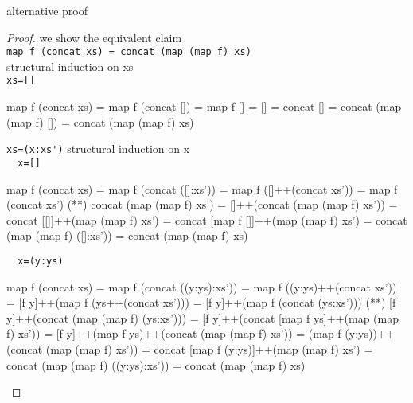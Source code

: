 \newpage
alternative proof
\begin{proof} we show the equivalent claim \\
\verb|map f (concat xs) = concat (map (map f) xs)|\\
structural induction on xs\\
\verb|xs=[]|
\begin{code}
map f (concat xs) = map f (concat [])
                  = map f []
                  = []
                  = concat []
                  = concat (map (map f) [])
                  = concat (map (map f) xs)
\end{code}
\verb|xs=(x:xs')|
structural induction on x\\
\verb|  x=[]|
\begin{code}
map f (concat xs) = map f (concat ([]:xs'))
                  = map f ([]++(concat xs'))
                  = map f (concat xs')
                  (**) concat (map (map f) xs')
                  = []++(concat (map (map f) xs'))
                  = concat [[]]++(map (map f) xs')
                  = concat [map f []]++(map (map f) xs')
                  = concat (map (map f) ([]:xs'))
                  = concat (map (map f) xs)
\end{code}
\verb|  x=(y:ys)|
\begin{code}
map f (concat xs) = map f (concat ((y:ys):xs'))
                  = map f ((y:ys)++(concat xs'))
                  = [f y]++(map f (ys++(concat xs')))
                  = [f y]++(map f (concat (ys:xs')))
                  (**) [f y]++(concat (map (map f) (ys:xs')))
                  = [f y]++(concat [map f ys]++(map (map f) xs'))
                  = [f y]++(map f ys)++(concat (map (map f) xs'))
                  = (map f (y:ys))++(concat (map (map f) xs'))
                  = concat [map f (y:ys)]++(map (map f) xs')
                  = concat (map (map f) ((y:ys):xs'))
                  = concat (map (map f) xs)
\end{code}
\end{proof}